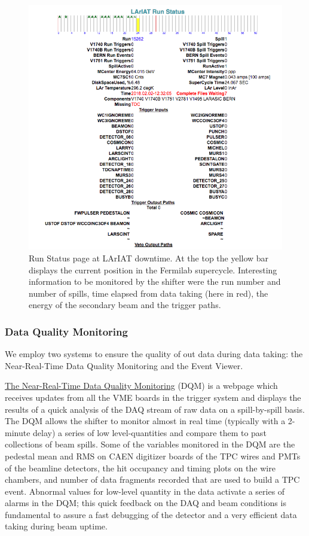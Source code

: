 \begin{figure}[htb]
\centering
\includegraphics[scale=0.6]{Chapter-3/Images/RunConditions.png}
\caption{Run Status page at LArIAT downtime. At the top the yellow bar displays the current position in the Fermilab supercycle. Interesting information to be monitored by the shifter were the run number and number of spills, time elapsed from data taking (here in red), the energy of the secondary beam and the trigger paths.}
\label{fig:runcond}
\end{figure}



\subsubsection{Data Quality Monitoring}
We employ two systems to ensure the quality of out data during data taking: the Near-Real-Time Data Quality Monitoring and the Event Viewer.

\href{http://lariat-daq01.fnal.gov:5000/}{The Near-Real-Time Data Quality Monitoring} (DQM) is a  webpage which receives updates from all the VME boards in the trigger system and displays the results of a quick analysis of the DAQ stream of raw data on a spill-by-spill basis. The DQM allows the shifter to monitor almost in real time (typically with a 2-minute delay)  a series of low level-quantities and compare them to past collections of beam spills. Some of the variables monitored in the DQM are  the pedestal mean and RMS on CAEN digitizer boards
of the TPC wires and PMTs of the beamline detectors, the hit occupancy and timing plots on the wire chambers, and number of data fragments recorded that are used to build a TPC event. Abnormal values for  low-level quantity in the data  activate a series of alarms in the DQM; this quick feedback on the DAQ and beam conditions is fundamental to assure a fast debugging of the detector and a very efficient data taking during beam uptime.

